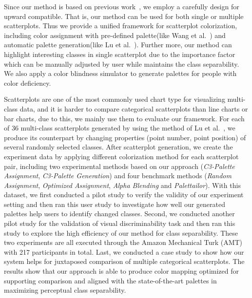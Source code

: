 Since our method is based on previous work~\cite{Wang2018, Lu21}, we employ a carefully design for upward compatible. That is, our method can be used for both single or multiple scatterplots. Thus we provide a unified framework for scatterplot colorization, including color assignment with pre-defined palette(like Wang et al.~\cite{Wang2018}) and automatic palette generation(like Lu et al.~\cite{Lu21}). Further more, our method can highlight interesting classes in single scatterplot due to the importance factor which can be manually adjusted by user while maintains the class separability. We also apply a color blindness simulator to generate palettes for people with color deficiency. 

Scatterplots are one of the most commonly used chart type for visualizing multi-class data, and it is harder to compare categorical scatterplots than line charts or bar charts, due to this, we mainly use them to evaluate our framework. For each of 36 multi-class scatterplots generated by using the method of Lu et al.~\cite{Lu21}, we produce its counterpart by changing properties (point number, point position) of several randomly selected classes. After scatterplot generation, we create the experiment data by applying different colorization method for each scatterplot pair, including two experimental methods based on our approach (\emph{C3-Palette Assignment}, \emph{C3-Palette Generation}) and four benchmark methods (\emph{Random Assignment}, \emph{Optimized Assignment}, \emph{Alpha Blending} and \emph{Palettailor}). With this dataset, we first conducted a pilot study to verify the validity of our experiment setting and then ran this user study to investigate how well our generated palettes help users to identify changed classes.
Second, we conducted another pilot study for the validation of visual discriminability task and then ran this study to explore the high efficiency of our method for class separability.
These two experiments are all executed through the Amazon Mechanical Turk (AMT) with 217 participants in total.
Last, we conducted a case study to show how our system helps for juxtaposed comparison of multiple categorical scatterplots.
The results show that our approach is able to produce color mapping optimized for supporting comparison and aligned with the state-of-the-art palettes in maximizing perceptual class separability.

